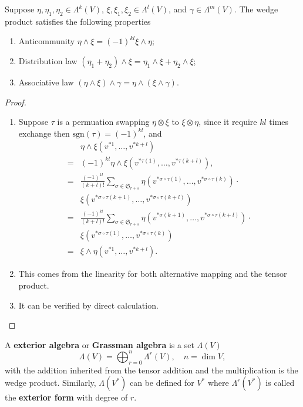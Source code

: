 \begin{theorem}
Suppose $\eta,\eta_1,\eta_2\in\Lambda^k(V)$, $\xi,\xi_1,\xi_2\in\Lambda^l(V)$, and $\gamma\in\Lambda^m(V)$. The wedge product satisfies the following properties
\begin{enumerate}
\item Anticommunity $\eta\wedge\xi =(-1)^{kl}\xi\wedge\eta$;
\item Distribution law $(\eta_1+\eta_2)\wedge\xi=\eta_1\wedge\xi+\eta_2\wedge\xi$;
\item Associative law $(\eta\wedge\xi)\wedge\gamma=\eta\wedge(\xi\wedge\gamma)$.
\end{enumerate}
\end{theorem}

\begin{proof}
\begin{enumerate}
\item Suppose $\tau$ is a permuation swapping $\eta\otimes\xi$ to $\xi\otimes\eta$, since it require $kl$ times exchange then $\text{sgn}(\tau)=(-1)^{kl}$, and 
\begin{equation*}
\begin{aligned}
&\eta\wedge\xi(v^{*1},\dots,v^{*k+l})\\
=&(-1)^{kl}\eta\wedge\xi\left(v^{*\tau(1)},\dots,v^{*\tau(k+l)}\right),\\
=&\frac{(-1)^{kl}}{(k+l)!}\sum_{\sigma\in\mathfrak{S}_{r+s}}\eta(v^{*\sigma\circ\tau(1)},\dots,v^{*\sigma\circ\tau(k)})\cdot\\
&\xi(v^{*\sigma\circ\tau(k+1)},\dots,v^{*\sigma\circ\tau(k+l)})\\
=&\frac{(-1)^{kl}}{(k+l)!}\sum_{\sigma\in\mathfrak{S}_{r+s}}\eta(v^{*\sigma(k+1)},\dots,v^{*\sigma\circ\tau(k+l)})\cdot\\
&\xi(v^{*\sigma\circ\tau(1)},\dots,v^{*\sigma\circ\tau(k)})\\
=&\xi\wedge\eta(v^{*1},\dots,v^{*k+l}).
\end{aligned}
\end{equation*}
\item This comes from the linearity for both alternative mapping and the tensor product.
\item It can be verified by direct calculation. 
\end{enumerate}
\end{proof}

\begin{definition}
A \textbf{exterior algebra} or \textbf{Grassman algebra} is a set $\Lambda(V)$
\begin{equation}
\Lambda(V)=\bigoplus_{r=0}^n\Lambda^r(V),\quad n=\dim V,
\end{equation}
with the addition inherited from the tensor addition and the multiplication is the wedge product. Similarly, $\Lambda(V^*)$ can be defined for $V^*$ where $\Lambda^r(V^*)$ is called the \textbf{exterior form} with degree of $r$. 
\end{definition}

